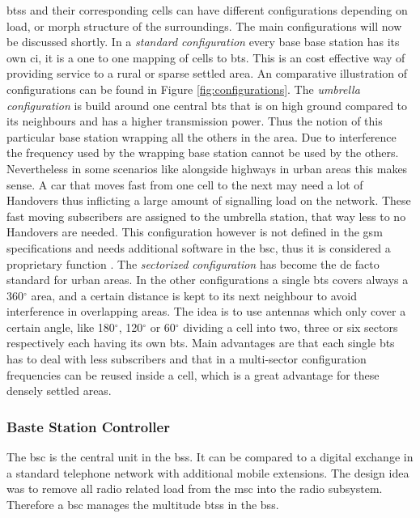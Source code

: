 \glspl{bts} and their corresponding cells can have different configurations depending on load, or morph structure of the surroundings.
The main configurations will now be discussed shortly.
In a \emph{standard configuration} every base base station has its own \gls{ci}, it is a one to one mapping of cells to \gls{bts}.
This is an cost effective way of providing service to a rural or sparse settled area.
An comparative illustration of configurations can be found in Figure \ref{fig:configurations}.
The \emph{umbrella configuration} is build around one central \gls{bts} that is on high ground compared to its neighbours and has a higher transmission power.
Thus the notion of this particular base station wrapping all the others in the area.
Due to interference the frequency used by the wrapping base station cannot be used by the others.
Nevertheless in some scenarios like alongside highways in urban areas this makes sense.
A car that moves fast from one cell to the next may need a lot of Handovers thus inflicting a large amount of signalling load on the network.
These fast moving subscribers are assigned to the umbrella station, that way less to no Handovers are needed.
This configuration however is not defined in the \gls{gsm} specifications and needs additional software in the \gls{bsc}, thus it is considered a proprietary function \cite{protocols1999}.
The \emph{sectorized configuration} has become the de facto standard for urban areas.
In the other configurations a single \gls{bts} covers always a 360$^\circ$ area, and a certain distance is kept to its next neighbour to avoid interference in overlapping areas.
The idea is to use antennas which only cover a certain angle, like 180$^\circ$, 120$^\circ$ or 60$^\circ$ dividing a cell into two, three or six sectors respectively each having its own \gls{bts}.
Main advantages are that each single \gls{bts} has to deal with less subscribers and that in a multi-sector configuration frequencies can be reused inside a cell, which is  a great advantage for these densely settled areas.

\subsubsection{Baste Station Controller}
The \gls{bsc} is the central unit in the \gls{bss}.
It can be compared to a digital exchange in a standard telephone network with additional mobile extensions.
The design idea was to remove all radio related load from the \gls{msc} into the radio subsystem.
Therefore a \gls{bsc} manages the multitude \glspl{bts} in the \gls{bss}.

